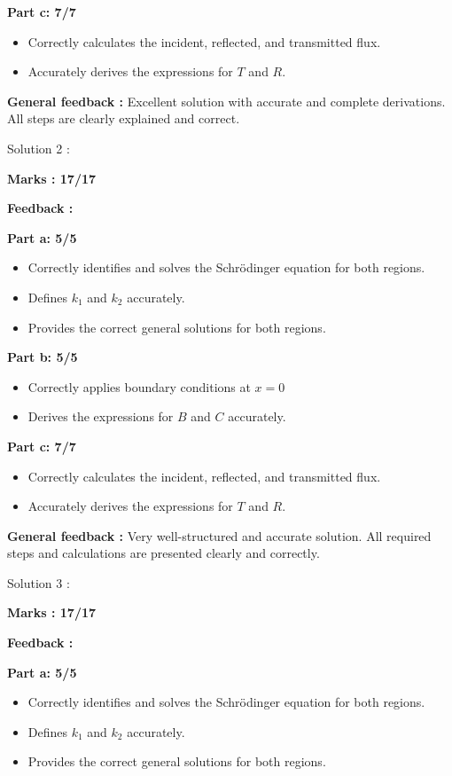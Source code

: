 \documentclass[a4paper,11pt]{article}
\begin{document}
\textbf{Part c: 7/7}
\begin{itemize}
    \item Correctly calculates the incident, reflected, and transmitted flux.
    \item Accurately derives the expressions for $T$ and $R$.
\end{itemize}


\textbf{General feedback :}
Excellent solution with accurate and complete derivations. All steps are clearly explained and correct.


Solution 2 :

\textbf{Marks : 17/17}

\textbf{Feedback :}

\textbf{Part a: 5/5}
\begin{itemize}
    \item Correctly identifies and solves the Schrödinger equation for both regions.
    \item Defines $k_1$ and $k_2$ accurately.
    \item Provides the correct general solutions for both regions.
\end{itemize}


\textbf{Part b: 5/5}
\begin{itemize}
    \item Correctly applies boundary conditions at $x = 0$
    \item Derives the expressions for $B$ and $C$ accurately.
\end{itemize}

\textbf{Part c: 7/7}
\begin{itemize}
    \item Correctly calculates the incident, reflected, and transmitted flux.
    \item Accurately derives the expressions for $T$ and $R$.
\end{itemize}


\textbf{General feedback :}
Very well-structured and accurate solution. All required steps and calculations are presented clearly and correctly.


Solution 3 :


\textbf{Marks : 17/17}

\textbf{Feedback :}

\textbf{Part a: 5/5}
\begin{itemize}
    \item Correctly identifies and solves the Schrödinger equation for both regions.
    \item Defines $k_1$ and $k_2$ accurately.
    \item Provides the correct general solutions for both regions.
\end{itemize}
\end{document}
